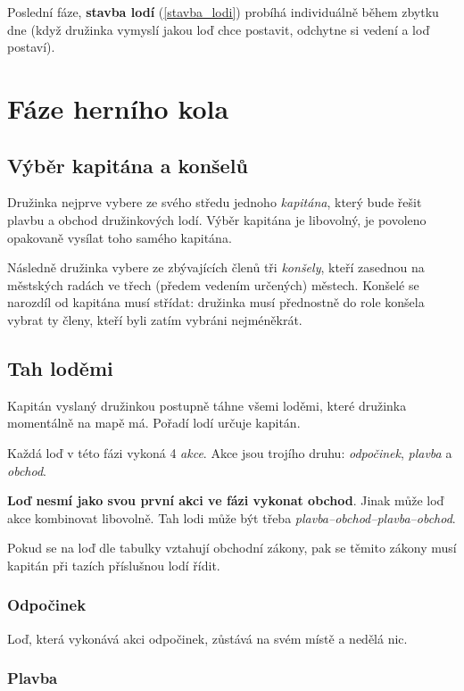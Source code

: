 \documentclass[a4paper, 12pt, twoside]{article}
\begin{document}
Poslední fáze, \textbf{stavba lodí} (\ref{stavba_lodi}) probíhá individuálně během zbytku dne (když družinka vymyslí jakou loď chce postavit, odchytne
si vedení a loď postaví).


\section{Fáze herního kola}
\label{faze}

\subsection{Výběr kapitána a konšelů}

Družinka nejprve vybere ze svého středu jednoho \emph{kapitána}, který bude řešit plavbu a obchod družinkových lodí.  Výběr kapitána je libovolný, je povoleno opakovaně
vysílat toho samého kapitána.

Následně družinka vybere ze zbývajících členů tři \emph{konšely}, kteří zasednou na městských radách ve třech (předem vedením určených) městech.  
Konšelé se narozdíl od kapitána musí střídat: družinka musí přednostně do role konšela vybrat ty členy, kteří byli zatím vybráni nejméněkrát.  


\subsection{Tah loděmi}
\label{tah_lodemi}

Kapitán vyslaný družinkou postupně táhne všemi loděmi, které družinka momentálně na mapě má.  Pořadí lodí určuje kapitán.

Každá loď v této fázi vykoná 4 \emph{akce}.  Akce jsou trojího druhu: \emph{odpočinek}, \emph{plavba} a \emph{obchod}.

    \textbf{Loď nesmí jako svou první akci ve fázi vykonat obchod}.  Jinak může loď akce kombinovat libovolně.  Tah lodi může být třeba \emph{plavba--obchod--plavba--obchod}.

Pokud se na loď dle tabulky vztahují obchodní zákony, pak se těmito zákony musí kapitán při tazích příslušnou lodí řídit.

\subsubsection{Odpočinek}

Loď, která vykonává akci odpočinek, zůstává na svém místě a nedělá nic.

\subsubsection{Plavba}
\end{document}
